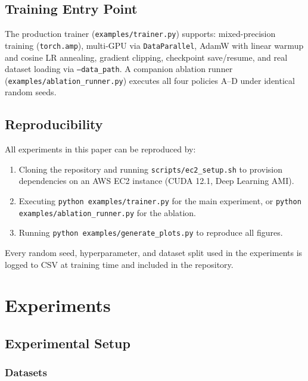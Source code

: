 \documentclass[lettersize,journal]{IEEEtran}
\begin{document}
\subsection{Training Entry Point}

The production trainer (\texttt{examples/trainer.py}) supports:
mixed-precision training (\texttt{torch.amp}),
multi-GPU via \texttt{DataParallel},
AdamW with linear warmup and cosine LR annealing,
gradient clipping,
checkpoint save/resume,
and real dataset loading via \texttt{--data\_path}.
A companion ablation runner (\texttt{examples/ablation\_runner.py})
executes all four policies A--D under identical random seeds.

\subsection{Reproducibility}

All experiments in this paper can be reproduced by:
\begin{enumerate}
  \item Cloning the repository and running
    \texttt{scripts/ec2\_setup.sh} to provision dependencies on an
    AWS EC2 instance (CUDA 12.1, Deep Learning AMI).
  \item Executing \texttt{python examples/trainer.py} for the
    main experiment, or \texttt{python examples/ablation\_runner.py}
    for the ablation.
  \item Running \texttt{python examples/generate\_plots.py} to
    reproduce all figures.
\end{enumerate}
Every random seed, hyperparameter, and dataset split used in the
experiments is logged to CSV at training time and included in
the repository.


\section{Experiments}
\label{sec:experiments}

\subsection{Experimental Setup}

\subsubsection{Datasets}
\end{document}
